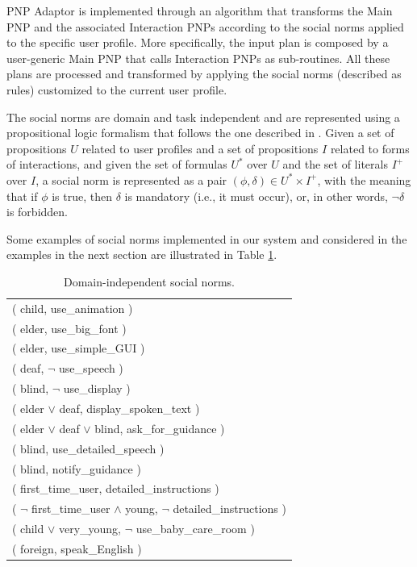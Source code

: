 PNP Adaptor is implemented through an algorithm that transforms the Main PNP and the associated Interaction PNPs according to the social norms applied to the specific user profile. More specifically, the input plan is composed by a user-generic Main PNP that calls Interaction PNPs as sub-routines. All these plans are processed and transformed by applying the social norms (described as rules) customized to the current user profile.

The social norms are domain and task independent and are represented using a propositional logic formalism that follows the one described in \cite{BoPiTo09}. 
Given a set of propositions $U$ related to user profiles and a set of propositions $I$ related to forms of interactions, and given the set of formulas $U^{*}$ over $U$ and the set of literals $I^{+}$ over $I$,
a social norm is represented as a pair $(\phi,\delta) \in U^{*} \times I^{+}$, %
with the meaning that if $\phi$ is true, then $\delta$ is mandatory (i.e., it must occur), or, in other words, $\neg \delta$ is forbidden. 

Some examples of social norms implemented in our system and considered in the examples in the next section are illustrated in Table \ref{tab:socialnorms}. 

\begin{table}
\begin{center}
\begin{tabular}{|l|} \hline
( child, use\_animation ) \\ 
( elder, use\_big\_font ) \\ 
( elder, use\_simple\_GUI ) \\
( deaf, $\neg$ use\_speech ) \\
( blind, $\neg$ use\_display ) \\
( elder $\vee$ deaf, display\_spoken\_text ) \\ 
( elder $\vee$ deaf $\vee$ blind, ask\_for\_guidance ) \\
( blind, use\_detailed\_speech ) \\
( blind, notify\_guidance ) \\
( first\_time\_user, detailed\_instructions ) \\ 
( $\neg$ first\_time\_user $\wedge$ young, $\neg$ detailed\_instructions ) \\ 
( child $\vee$ very\_young, $\neg$ use\_baby\_care\_room ) \\ 
( foreign, speak\_English ) \\ 
\hline
\end{tabular}
\caption{Domain-independent social norms.}
\label{tab:socialnorms}
\end{center}
\vspace{-0.8cm}
\end{table}

